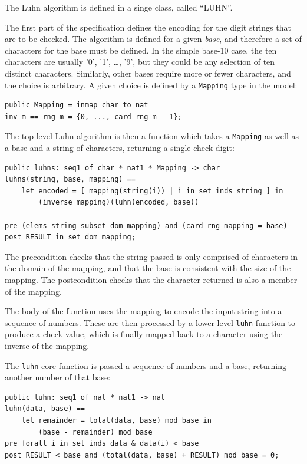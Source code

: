 \documentclass{overturerepchap}
\begin{document}
The Luhn algorithm is defined in a singe class, called ``LUHN''.

The first part of the specification defines the encoding for the digit
strings that are to be checked. The algorithm is defined for a given
\emph{base}, and therefore a set of characters for the base must be defined. In
the simple base-10 case, the ten characters are usually '0', '1', \ldots, '9',
but they could be any selection of ten distinct characters. Similarly, other
bases require more or fewer characters, and the choice is arbitrary. A given
choice is defined by a \texttt{Mapping} type in the model:

\small
\begin{lstlisting}
public Mapping = inmap char to nat
inv m == rng m = {0, ..., card rng m - 1};
\end{lstlisting}
\normalsize

\noindent The top level Luhn algorithm is then a function which takes a
\texttt{Mapping} as well as a base and a string of characters, returning a
single check digit:

\small
\begin{lstlisting}
public luhns: seq1 of char * nat1 * Mapping -> char
luhns(string, base, mapping) ==
    let encoded = [ mapping(string(i)) | i in set inds string ] in
        (inverse mapping)(luhn(encoded, base))

pre (elems string subset dom mapping) and (card rng mapping = base)
post RESULT in set dom mapping;
\end{lstlisting}
\normalsize

The precondition checks that the string passed is only comprised of characters
in the domain of the mapping, and that the base is consistent with the size of
the mapping. The postcondition checks that the character returned is also a
member of the mapping.

The body of the function uses the mapping to encode the input string into a
sequence of numbers. These are then processed by a lower level \texttt{luhn}
function to produce a check value, which is finally mapped back to a character
using the inverse of the mapping.

The \texttt{luhn} core function is passed a sequence of numbers and a base,
returning another number of that base:

\small
\begin{lstlisting}
public luhn: seq1 of nat * nat1 -> nat
luhn(data, base) ==
    let remainder = total(data, base) mod base in
        (base - remainder) mod base
pre forall i in set inds data & data(i) < base
post RESULT < base and (total(data, base) + RESULT) mod base = 0;
\end{lstlisting}
\normalsize
\end{document}
